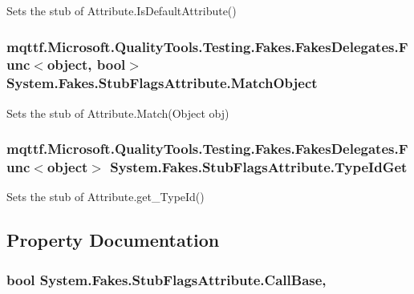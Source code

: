 Sets the stub of Attribute.\-Is\-Default\-Attribute()

\hypertarget{class_system_1_1_fakes_1_1_stub_flags_attribute_a9904bb2c20c4c2959708117ecba1a2bc}{
\subsubsection[{Match\-Object}]{\setlength{\rightskip}{0pt plus 5cm}mqttf.\-Microsoft.\-Quality\-Tools.\-Testing.\-Fakes.\-Fakes\-Delegates.\-Func$<$object, bool$>$ System.\-Fakes.\-Stub\-Flags\-Attribute.\-Match\-Object}}\label{class_system_1_1_fakes_1_1_stub_flags_attribute_a9904bb2c20c4c2959708117ecba1a2bc}


Sets the stub of Attribute.\-Match(\-Object obj)

\hypertarget{class_system_1_1_fakes_1_1_stub_flags_attribute_afe313249037fdec107fa459a64673fe4}{
\subsubsection[{Type\-Id\-Get}]{\setlength{\rightskip}{0pt plus 5cm}mqttf.\-Microsoft.\-Quality\-Tools.\-Testing.\-Fakes.\-Fakes\-Delegates.\-Func$<$object$>$ System.\-Fakes.\-Stub\-Flags\-Attribute.\-Type\-Id\-Get}}\label{class_system_1_1_fakes_1_1_stub_flags_attribute_afe313249037fdec107fa459a64673fe4}


Sets the stub of Attribute.\-get\-\_\-\-Type\-Id()



\subsection{Property Documentation}
\hypertarget{class_system_1_1_fakes_1_1_stub_flags_attribute_aa4cd676c172e42dd1aff52ae63601b5b}{
\subsubsection[{Call\-Base}]{\setlength{\rightskip}{0pt plus 5cm}bool System.\-Fakes.\-Stub\-Flags\-Attribute.\-Call\-Base\hspace{0.3cm}{\ttfamily [get]}, {\ttfamily [set]}}}\label{class_system_1_1_fakes_1_1_stub_flags_attribute_aa4cd676c172e42dd1aff52ae63601b5b}


